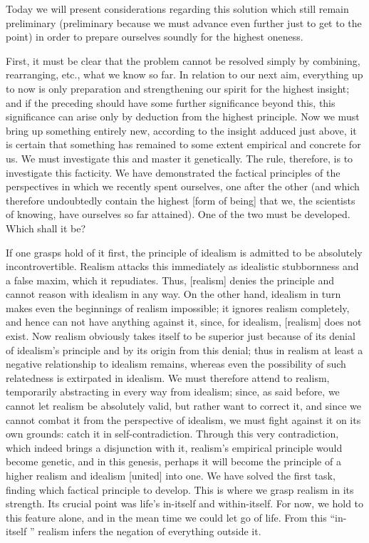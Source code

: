 Today we will present considerations
regarding this solution
which still remain preliminary
(preliminary because we must advance
even further just to get to the point)
in order to prepare ourselves soundly
for the highest oneness.

First, it must be clear that the problem
cannot be resolved simply by
combining, rearranging, etc.,
what we know so far.
In relation to our next aim,
everything up to now is only
preparation and strengthening our spirit
for the highest insight;
and if the preceding should have
some further significance beyond this,
this significance can arise only
by deduction from the highest principle.
Now we must bring up something entirely new,
according to the insight adduced just above,
it is certain that something has remained
to some extent empirical and concrete for us.
We must investigate this and master it genetically.
The rule, therefore, is to investigate this facticity.
We have demonstrated the factical principles
of the perspectives in which we recently spent ourselves,
one after the other
(and which therefore undoubtedly contain
the highest [form of being] that we,
the scientists of knowing,
have ourselves so far attained).
One of the two must be developed.
Which shall it be?

If one grasps hold of it first,
the principle of idealism is
admitted to be absolutely incontrovertible.
Realism attacks this immediately
as idealistic stubbornness and a false maxim,
which it repudiates.
Thus, [realism] denies the principle
and cannot reason with idealism in any way.
On the other hand, idealism in turn makes
even the beginnings of realism impossible;
it ignores realism completely,
and hence can not have anything against it,
since, for idealism, [realism] does not exist.
Now realism obviously takes itself to be superior
just because of its denial of idealism’s principle
and by its origin from this denial;
thus in realism at least
a negative relationship to idealism remains,
whereas even the possibility of such relatedness
is extirpated in idealism.
We must therefore attend to realism,
temporarily abstracting in every way from idealism;
since, as said before, we cannot let
realism be absolutely valid,
but rather want to correct it,
and since we cannot combat it
from the perspective of idealism,
we must fight against it on its own grounds:
catch it in self-contradiction.
Through this very contradiction,
which indeed brings a disjunction with it,
realism’s empirical principle would become genetic,
and in this genesis, perhaps it will become
the principle of a higher realism and idealism [united] into one.
We have solved the first task,
finding which factical principle to develop.
This is where we grasp realism in its strength.
Its crucial point was life’s in-itself and within-itself.
For now, we hold to this feature alone,
and in the mean time we could let go of life.
From this “in-itself ” realism infers
the negation of everything outside it.

